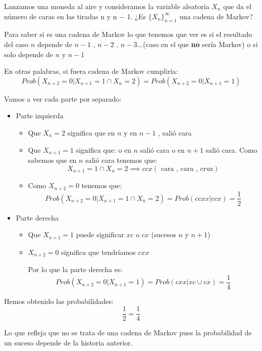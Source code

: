 \begin{problem}[3]
	Lanzamos una moneda al aire y consideramos la variable aleatoria $X_n$ que da el número
	de caras en las tiradas n y n − 1. ¿Es $\{X_n\}^{\infty}_{n=1}$ una cadena de Markov?
	\solution

	Para saber si es una cadena de Markov lo que tenemos que ver es si el resultado del caso $n$ depende de $n-1$ , $n-2$ , $n-3$...(caso en el que \textbf{no} sería Markov) o si solo depende de $n$ y $n-1$

	En otras palabras, si fuera cadena de Markov cumpliría:
	$$Prob(X_{n+2} = 0| X_{n+1} = 1 \cap X_n = 2) = Prob(X_{n+2} = 0 | X_{n+1} = 1)$$

	Vamos a ver cada parte por separado:
	\begin{itemize}
		\item Parte izquierda
		\begin{itemize}
			\item Que $X_n = 2$ significa que en $n$ y en $n-1$ , salió cara
			\item Que $X_{n+1} = 1$ significa que: o en $n$ salió cara o en $n+1$ salió cara. Como sabemos que en $n$ salió cara tenemos que:
			$$ X_{n+1} = 1 \cap X_n = 2 \implies ccx(\text{ cara , cara , cruz})$$
			\item Como $X_{n+2} = 0$ tenemos que:
			$$Prob(X_{n+2} = 0| X_{n+1} = 1 \cap X_n = 2) = Prob(ccxx| ccx) = \frac{1}{2}$$
		\end{itemize}
		\item Parte derecha
		\begin{itemize}
			\item Que $X_{n+1} = 1$ puede significar $xc$ o $cx$ (sucesos $n$ y $n+1$)
			\item $X_{n+2} = 0$ significa que tendríamos $cxx$


			Por lo que la parte derecha es:
			$$Prob(X_{n+2} = 0 | X_{n+1} = 1) = Prob (cxx| xc \cup cx) = \frac{1}{4}$$
		\end{itemize}

	\end{itemize}

	Hemos obtenido las probabilidades:
	 $$ \frac{1}{2} = \frac{1}{4}$$

	Lo que refleja que no se trata de una cadena de Markov pues la probabilidad de un suceso depende de la historia anterior.

\end{problem}


